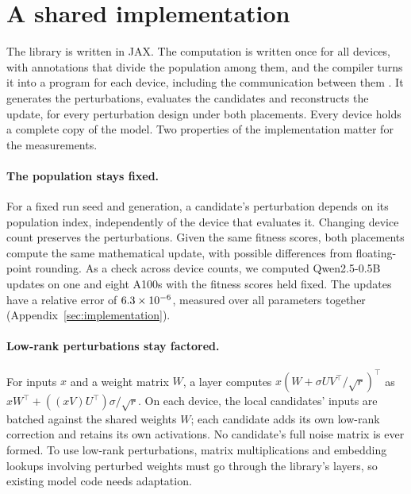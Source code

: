 \section{A shared implementation}
\label{sec:instrument}

The library is written in JAX. The computation is written once for all devices, with
annotations that divide the population among them, and the compiler turns it into a
program for each device, including the communication between them
\citep{jax2018,gspmd2021}. It generates the perturbations, evaluates the candidates and
reconstructs the update, for every perturbation design under both placements. Every
device holds a complete copy of the model. Two properties of the implementation matter
for the measurements.

\paragraph{The population stays fixed.} For a fixed run seed and generation, a
candidate's perturbation depends on its population index, independently of the device
that evaluates it. Changing device count preserves the perturbations. Given the same
fitness scores, both placements compute the same mathematical update, with possible
differences from floating-point rounding. As a check across device counts, we computed
Qwen2.5-0.5B updates on one and eight A100s with the fitness scores held fixed. The updates
have a relative error of $6.3\times10^{-6}$, measured over all parameters together
(Appendix~\ref{sec:implementation}).

\paragraph{Low-rank perturbations stay factored.} For inputs $x$ and a weight matrix
$W$, a layer computes $x(W+\sigma UV^\top/\sqrt r)^\top$ as
$xW^\top+((xV)U^\top)\sigma/\sqrt r$. On each device, the local candidates' inputs are
batched against the shared weights $W$; each candidate adds its own low-rank correction
and retains its own activations. No candidate's full noise matrix is ever formed. To use
low-rank perturbations, matrix multiplications and embedding lookups involving perturbed
weights must go through the library's layers, so existing model code needs adaptation.
